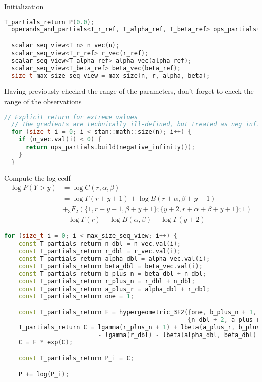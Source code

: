 \documentclass[11pt]{article}
\begin{document}
Initialization
\begin{lstlisting}[language=c++, style=lgeneral]
  T_partials_return P(0.0);
  operands_and_partials<T_r_ref, T_alpha_ref, T_beta_ref> ops_partials(r_ref, alpha_ref, beta_ref);

  scalar_seq_view<T_n> n_vec(n);
  scalar_seq_view<T_r_ref> r_vec(r_ref);
  scalar_seq_view<T_alpha_ref> alpha_vec(alpha_ref);
  scalar_seq_view<T_beta_ref> beta_vec(beta_ref);
  size_t max_size_seq_view = max_size(n, r, alpha, beta);
\end{lstlisting}

Having previously checked the range of the parameters, don’t forget to check the range of the observations
\begin{lstlisting}[language=c++, style=lgeneral]
  // Explicit return for extreme values
  // The gradients are technically ill-defined, but treated as neg infinity
  for (size_t i = 0; i < stan::math::size(n); i++) {
    if (n_vec.val(i) < 0) {
      return ops_partials.build(negative_infinity());
    }
  }
\end{lstlisting}

Compute the log ccdf
\begin{equation}
\begin{aligned}
 \log P(Y > y) &= \log C(r,\alpha,\beta) \\
&= \log\Gamma (r+y +1) + \log B(r+\alpha ,\beta +y +1) \\
&+ {}_3F_2(\{1,r+y +1,\beta +y +1\}; \{y +2,r+\alpha +\beta +y +1\};1) \\
&-\log\Gamma (r) -\log B(\alpha ,\beta ) -\log\Gamma (y +2)
\end{aligned}
\end{equation}
\begin{lstlisting}[language=c++, style=lgeneral]
  for (size_t i = 0; i < max_size_seq_view; i++) {
    const T_partials_return n_dbl = n_vec.val(i);
    const T_partials_return r_dbl = r_vec.val(i);
    const T_partials_return alpha_dbl = alpha_vec.val(i);
    const T_partials_return beta_dbl = beta_vec.val(i);
    const T_partials_return b_plus_n = beta_dbl + n_dbl;
    const T_partials_return r_plus_n = r_dbl + n_dbl;
    const T_partials_return a_plus_r = alpha_dbl + r_dbl;
    const T_partials_return one = 1;

    const T_partials_return F = hypergeometric_3F2({one, b_plus_n + 1, r_plus_n + 1},
                                                   {n_dbl + 2, a_plus_r + b_plus_n + 1}, one);
    T_partials_return C = lgamma(r_plus_n + 1) + lbeta(a_plus_r, b_plus_n + 1)
                          - lgamma(r_dbl) - lbeta(alpha_dbl, beta_dbl) - lgamma(n_dbl + 2);
    C = F * exp(C);

    const T_partials_return P_i = C;

    P += log(P_i);
\end{lstlisting}
\end{document}
